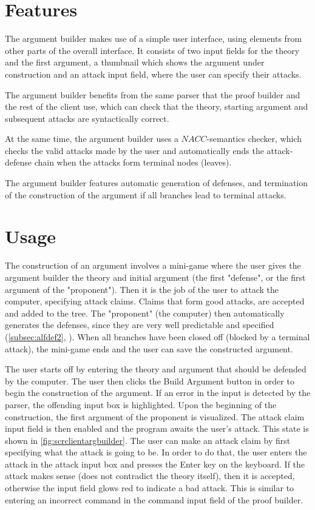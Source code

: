\documentclass[11pt,twoside,a4paper]{report}
\begin{document}
\section{Features}
The argument builder makes use of a simple user interface, using elements from other parts of the overall interface. It consists of two input fields for the theory and the first argument, a thumbnail which shows the argument under construction and an attack input field, where the user can specify their attacks.

The argument builder benefits from the same parser that the proof builder and the rest of the client use, which can check that the theory, starting argument and subsequent attacks are syntactically correct.

At the same time, the argument builder uses a $NACC$-semantics checker, which checks the valid attacks made by the user and automatically ends the attack-defense chain when the attacks form terminal nodes (leaves).

The argument builder features automatic generation of defenses, and termination of the construction of the argument if all branches lead to terminal attacks.

\section{Usage}
The construction of an argument involves a mini-game where the user gives the argument builder the theory and initial argument (the first "defense", or the first argument of the "proponent"). Then it is the job of the user to attack the computer, specifying attack claims. Claims that form good attacks, are accepted and added to the tree. The "proponent" (the computer) then automatically generates the defenses, since they are very well predictable and specified (\autoref{subsec:alfdef2}, ). When all branches have been closed off (blocked by a terminal attack), the mini-game ends and the user can save the constructed argument.

The user starts off by entering the theory and argument that should be defended by the computer. The user then clicks the Build Argument button in order to begin the construction of the argument. If an error in the input is detected by the parser, the offending input box is highlighted. Upon the beginning of the construction, the first argument of the proponent is visualized. The attack claim input field is then enabled and the program awaits the user's attack. This state is shown in \autoref{fig:scrclientargbuilder}. The user can make an attack claim by first specifying what the attack is going to be. In order to do that, the user enters the attack in the attack input box and presses the Enter key on the keyboard. If the attack makes sense (does not contradict the theory itself), then it is accepted, otherwise the input field glows red to indicate a bad attack. This is similar to entering an incorrect command in the command input field of the proof builder.
\end{document}
